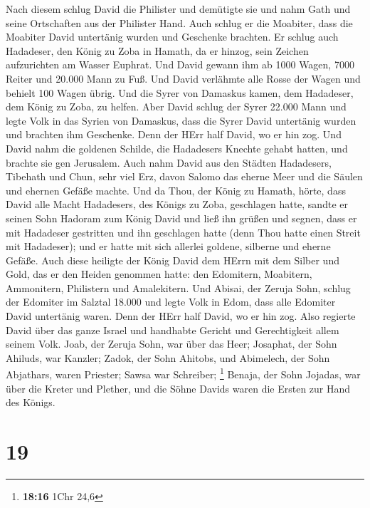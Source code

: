  Nach diesem schlug David die Philister und demütigte sie
und nahm Gath und seine Ortschaften aus der Philister Hand.
 Auch schlug er die Moabiter, dass die Moabiter David
untertänig wurden und Geschenke brachten.  Er schlug auch
Hadadeser, den König zu Zoba in Hamath, da er hinzog, sein Zeichen
aufzurichten am Wasser Euphrat.  Und David gewann ihm ab
1000 Wagen, 7000 Reiter und 20.000 Mann zu Fuß. Und David verlähmte alle
Rosse der Wagen und behielt 100 Wagen übrig.  Und die
Syrer von Damaskus kamen, dem Hadadeser, dem König zu Zoba, zu helfen.
Aber David schlug der Syrer 22.000 Mann  und legte Volk in
das Syrien von Damaskus, dass die Syrer David untertänig wurden und
brachten ihm Geschenke. Denn der HErr half David, wo er hin zog.
 Und David nahm die goldenen Schilde, die Hadadesers
Knechte gehabt hatten, und brachte sie gen Jerusalem. 
Auch nahm David aus den Städten Hadadesers, Tibehath und Chun, sehr viel
Erz, davon Salomo das eherne Meer und die Säulen und ehernen Gefäße
machte.  Und da Thou, der König zu Hamath, hörte, dass
David alle Macht Hadadesers, des Königs zu Zoba, geschlagen hatte,
 sandte er seinen Sohn Hadoram zum König David und ließ
ihn grüßen und segnen, dass er mit Hadadeser gestritten und ihn
geschlagen hatte (denn Thou hatte einen Streit mit Hadadeser); und er
hatte mit sich allerlei goldene, silberne und eherne Gefäße.
 Auch diese heiligte der König David dem HErrn mit dem
Silber und Gold, das er den Heiden genommen hatte: den Edomitern,
Moabitern, Ammonitern, Philistern und Amalekitern.  Und
Abisai, der Zeruja Sohn, schlug der Edomiter im Salztal 18.000
 und legte Volk in Edom, dass alle Edomiter David
untertänig waren. Denn der HErr half David, wo er hin zog.
 Also regierte David über das ganze Israel und handhabte
Gericht und Gerechtigkeit allem seinem Volk.  Joab, der
Zeruja Sohn, war über das Heer; Josaphat, der Sohn Ahiluds, war Kanzler;
 Zadok, der Sohn Ahitobs, und Abimelech, der Sohn
Abjathars, waren Priester; Sawsa war Schreiber; \footnote{\textbf{18:16}
  1Chr 24,6}  Benaja, der Sohn Jojadas, war über die
Kreter und Plether, und die Söhne Davids waren die Ersten zur Hand des
Königs.

\hypertarget{section-18}{%
\section{19}\label{section-18}}

